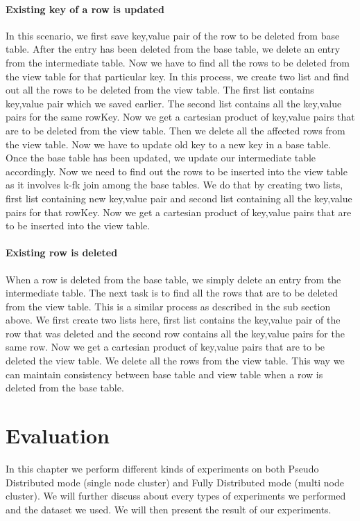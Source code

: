 \documentclass[11pt,a4paper,bibtotoc,idxtotoc,headsepline,footsepline,footexclude,BCOR12mm,DIV13]{scrbook}
\begin{document}
\subsubsection{Existing key of a row is updated}
In this scenario, we first save key,value pair of the row to be deleted from base table. After the entry has been deleted from the base table, we delete an entry from the intermediate table. Now we have to find all the rows to be deleted from the view table for that particular key. In this process, we create two list and find out all the rows to be deleted from the view table. The first list contains key,value pair which we saved earlier. The second list contains all the key,value pairs for the same rowKey. Now we get a cartesian product of key,value pairs that are to be deleted from the view table. Then we delete all the affected rows from the view table. Now we have to update old key to a new key in a base table. Once the base table has been updated, we update our intermediate table accordingly. Now we need to find out the rows to be inserted into the view table as it involves k-fk join among the base tables. We do that by creating two lists, first list containing new key,value pair and second list containing all the key,value pairs for that rowKey. Now we get a cartesian product of key,value pairs that are to be inserted into the view table.

\subsubsection{Existing row is deleted}
When a row is deleted from the base table, we simply delete an entry from the intermediate table. The next task is to find all the rows that are to be deleted from the view table. This is a similar process as described in the sub section above. We first create two lists here, first list contains the key,value pair of the row that was deleted and the second row contains all the key,value pairs for the same row. Now we get a cartesian product of key,value pairs that are to be deleted the view table. We delete all the rows from the view table. This way we can maintain consistency between base table and view table when a row is deleted from the base table.

\newpage
\chapter{Evaluation}
In this chapter we perform different kinds of experiments on both Pseudo Distributed mode (single node cluster) and Fully Distributed mode (multi node cluster). We will further discuss about every types of experiments we performed and the dataset we used. We will then present the result of our experiments.
\end{document}
